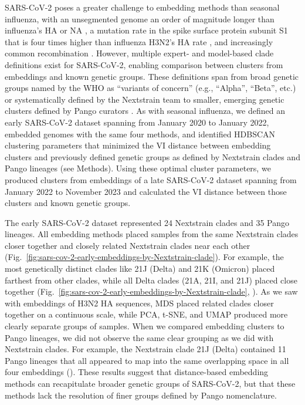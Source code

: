 \documentclass[10pt,letterpaper]{article}
\begin{document}
SARS-CoV-2 poses a greater challenge to embedding methods than seasonal influenza, with an unsegmented genome an order of magnitude longer than influenza's HA or NA \cite{Zhu2020}, a mutation rate in the spike surface protein subunit S1 that is four times higher than influenza H3N2's HA rate \cite{Kistler2022}, and increasingly common recombination \cite{Focosi2022,Turakhia2022}.
However, multiple expert- and model-based clade definitions exist for SARS-CoV-2, enabling comparison between clusters from embeddings and known genetic groups.
These definitions span from broad genetic groups named by the WHO as ``variants of concern'' (e.g., ``Alpha'', ``Beta'', etc.) \cite{Konings2021} or systematically defined by the Nextstrain team \cite{Hodcroft2020,Bedford2021,Roemer2022} to smaller, emerging genetic clusters defined by Pango curators \cite{OToole2021}.
As with seasonal influenza, we defined an early SARS-CoV-2 dataset spanning from January 2020 to January 2022, embedded genomes with the same four methods, and identified HDBSCAN clustering parameters that minimized the VI distance between embedding clusters and previously defined genetic groups as defined by Nextstrain clades and Pango lineages (see Methods).
Using these optimal cluster parameters, we produced clusters from embeddings of a late SARS-CoV-2 dataset spanning from January 2022 to November 2023 and calculated the VI distance between those clusters and known genetic groups.

The early SARS-CoV-2 dataset represented 24 Nextstrain clades and 35 Pango lineages.
All embedding methods placed samples from the same Nextstrain clades closer together and closely related Nextstrain clades near each other (Fig.~\ref{fig:sars-cov-2-early-embeddings-by-Nextstrain-clade}).
For example, the most genetically distinct clades like 21J (Delta) and 21K (Omicron) placed farthest from other clades, while all Delta clades (21A, 21I, and 21J) placed close together (Fig.~\ref{fig:sars-cov-2-early-embeddings-by-Nextstrain-clade}, ).
As we saw with embeddings of H3N2 HA sequences, MDS placed related clades closer together on a continuous scale, while PCA, t-SNE, and UMAP produced more clearly separate groups of samples.
When we compared embedding clusters to Pango lineages, we did not observe the same clear grouping as we did with Nextstrain clades.
For example, the Nextstrain clade 21J (Delta) contained 11 Pango lineages that all appeared to map into the same overlapping space in all four embeddings ().
These results suggest that distance-based embedding methods can recapitulate broader genetic groups of SARS-CoV-2, but that these methods lack the resolution of finer groups defined by Pango nomenclature.
\end{document}
